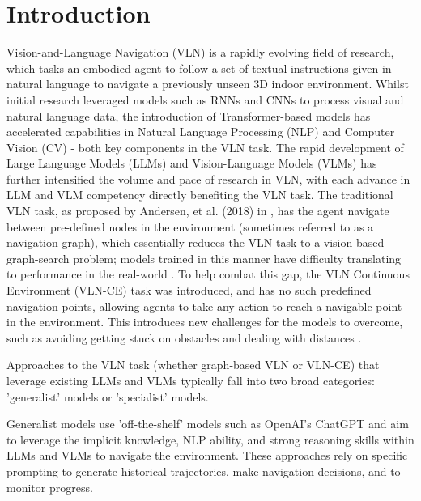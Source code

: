 \documentclass{svproc}
\begin{document}
\section{Introduction}
    Vision-and-Language Navigation (VLN) is a rapidly evolving field of research, which tasks an embodied agent to follow a set of textual instructions given in natural language to navigate a previously unseen 3D indoor environment. Whilst initial research leveraged models such as RNNs and CNNs to process visual and natural language data, the introduction of Transformer-based models \cite{attenion_is_all_you_need} has accelerated capabilities in Natural Language Processing (NLP) and Computer Vision (CV) - both key components in the VLN task. The rapid development of Large Language Models (LLMs) and Vision-Language Models (VLMs) has further intensified the volume and pace of research in VLN, with each advance in LLM and VLM competency directly benefiting the VLN task.
    The traditional VLN task, as proposed by Andersen, et al. (2018) in \cite{8578485}, has the agent navigate between pre-defined nodes in the environment (sometimes referred to as a navigation graph), which essentially reduces the VLN task to a vision-based graph-search problem; models trained in this manner have difficulty translating to performance in the real-world \cite{pmlr-v155-anderson21a}. To help combat this gap, the VLN Continuous Environment (VLN-CE) task was introduced, and has no such predefined navigation points, allowing agents to take any action to reach a navigable point in the environment. This introduces new challenges for the models to overcome, such as avoiding getting stuck on obstacles and dealing with distances \cite{krantz2020navgraphvisionandlanguagenavigationcontinuous}.
    \newline \par
    Approaches to the VLN task (whether graph-based VLN or VLN-CE) that leverage existing LLMs and VLMs typically fall into two broad categories: 'generalist' models or 'specialist' models.
    \par
    Generalist models \cite{long2023_discussnav, chen2024mapgptmapguidedpromptingadaptive, zhou2023navgptexplicitreasoningvisionandlanguage} use 'off-the-shelf' models such as OpenAI's ChatGPT \cite{CITATION_REQUIRED} and aim to leverage the implicit knowledge, NLP ability, and strong reasoning skills within LLMs and VLMs \cite{51647, LMs_as_knowledge_bases} to navigate the environment. These approaches rely on specific prompting to generate historical trajectories, make navigation decisions, and to monitor progress.
\end{document}
